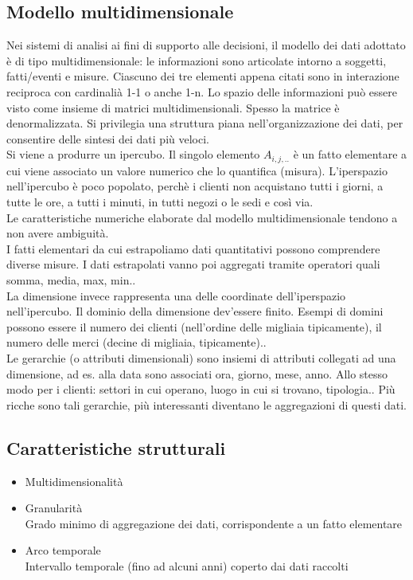 \subsection{Modello multidimensionale}
\label{sub:Modello multidimensionale}
Nei sistemi di analisi ai fini di supporto alle decisioni, il modello dei dati adottato
\`e di tipo multidimensionale: le informazioni sono articolate intorno a soggetti, fatti/eventi e misure.
Ciascuno dei tre elementi appena citati sono in interazione reciproca con cardinali\`a 1-1 o anche 1-n.
Lo spazio delle informazioni pu\`o essere visto come insieme di matrici multidimensionali.
Spesso la matrice \`e denormalizzata. Si privilegia una struttura piana nell'organizzazione dei dati,
per consentire delle sintesi dei dati pi\`u veloci.\\
Si viene a produrre un ipercubo. Il singolo elemento $A_{i,j,..}$ \`e un fatto elementare a cui viene associato un valore
numerico che lo quantifica (misura).
L'iperspazio nell'ipercubo \`e poco popolato, perch\`e i clienti non acquistano tutti i giorni, a tutte le ore, a tutti i minuti, in tutti negozi o le sedi e cos\`i via.\\
Le caratteristiche numeriche elaborate dal modello multidimensionale
tendono a non avere ambiguit\`a.\\
I fatti elementari da cui estrapoliamo dati quantitativi possono
comprendere diverse misure. I dati estrapolati vanno poi aggregati
tramite operatori quali somma, media, max, min..\\
La dimensione invece rappresenta una delle coordinate dell'iperspazio
nell'iper\-cubo. Il dominio della dimensione dev'essere finito. Esempi di domini possono essere il
numero dei clienti (nell'ordine delle migliaia tipicamente), il numero
delle merci (decine di migliaia, tipicamente)..\\
Le gerarchie (o attributi dimensionali) sono insiemi di attributi
collegati ad una dimensione, ad es. alla data sono associati ora,
giorno, mese, anno. Allo stesso modo per i clienti: settori in cui
operano, luogo in cui si trovano, tipologia.. Pi\`u ricche sono tali
gerarchie, pi\`u interessanti diventano le aggregazioni di questi dati.

\subsection{Caratteristiche
strutturali}\label{caratteristiche-strutturali}

\begin{itemize}

\item
  Multidimensionalit\`a
\item
  Granularit\`a\\
  Grado minimo di aggregazione dei dati, corrispondente a un fatto
  elementare
\item
  Arco temporale\\
  Intervallo temporale (fino ad alcuni anni) coperto dai dati raccolti
\end{itemize}

